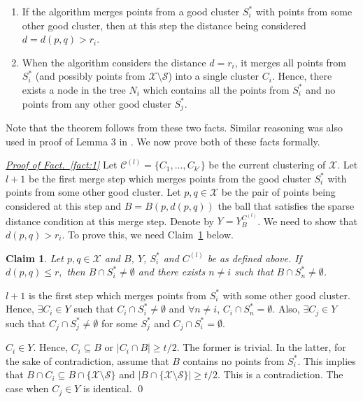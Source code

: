 \documentclass[letterpaper,12pt,titlepage,oneside,final]{book}
\newtheorem{smallLemma}{Claim}
\newcommand{\mc}{\mathcal}
\begin{document}
\begin{enumerate}[label=\textbf{F.\arabic*},leftmargin=0.3in]
\renewcommand\labelitemi{$\diamond$}
\item \label{fact:1} If the algorithm merges points from a good cluster $S_i^*$ with points from some other good cluster,  then at this step the distance being considered $d = d(p,q) > r_i$.	
\item \label{fact:2} When the algorithm considers the distance $d = r_i$, it merges all points from $S_i^*$ (and possibly points from $\mc X\setminus \mc S$) into a single cluster $C_i$. Hence, there exists a node in the tree $N_i$ which contains all the points from $S_i^*$ and no points from any other good cluster $S_j^*$. 	
\end{enumerate}
Note that the theorem follows from these two facts. Similar reasoning was also used in proof of Lemma 3 in \cite{balcan2012clustering}. We now prove both of these facts formally. 

\noindent\textit{\underline{Proof of Fact.~\ref{fact:1}}}
Let $\mc C^{(l)} = \{C_1, \ldots, C_{k'}\}$ be the current clustering of $\mc X$. Let $l+1$ be the first merge step which merges points from the good cluster $S_i^*$ with points from some other good cluster. Let $p, q \in \mc X$ be the pair of points being considered at this step and $B = B(p, d(p, q))$ the ball that satisfies the sparse distance condition at this merge step. Denote by $Y = Y_{B}^{C^{(l)}}$. We need to show that $d(p, q) > r_i$. To prove this, we need Claim~\ref{claim:fromBothCluster} below. 

\begin{smallLemma}
\label{claim:fromBothCluster}
Let $p, q \in \mc X$ and $B$, $Y$, $S_i^*$ and $C^{(l)}$ be as defined above. If $d(p, q) \le r,$ then $B \cap S_i^* \neq \emptyset$ and there exists $n \neq i$ such that $B \cap S_n^* \neq \emptyset$.
\end{smallLemma}
\vspace{-0.1in} $l+1$ is the first step which merges points from $S_i^*$ with some other good cluster. Hence, $\exists C_i \in Y$ such that $C_i\cap S_i^*  \neq \emptyset$ and $\forall n \neq i$, $C_i \cap S_n^* = \emptyset$. Also, $\exists C_j \in Y$ such that $C_j \cap S_j^* \neq \emptyset$ for some $S_j^*$ and $C_j \cap S_i^* = \emptyset$.

$C_i \in Y$. Hence, $C_i \subseteq B$ or $|C_i \cap B| \ge t/2$. The former is trivial. In the latter, for the sake of contradiction, assume that $B$ contains no points from $S_i^*$. This implies that $B \cap C_i \subseteq B \cap \{\mc X \setminus \mc S\}$ and $|B\cap \{\mc X \setminus \mc S\}| \ge t/2$. This  is a contradiction. The case when $C_j \in Y$ is identical. \qed
\end{document}
